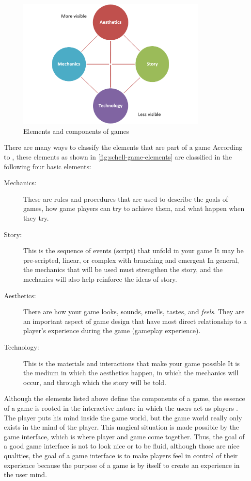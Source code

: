 \begin{figure}[htb]
 \caption{Elements and components of games}
 \label{fig:schell-game-elements}
 \centering
 \includegraphics[width=0.85\textwidth]{images/chap-general-background/schell-game-elements.png}
\end{figure}

There are many ways to classify the elements that are part of a game
According to , these elements as shown in \autoref{fig:schell-game-elements} are classified in the following four basic elements:

\begin{description}
\item[Mechanics:] These are rules and procedures that are used to describe the goals of games, how game players can try to achieve them, and what happen when they try.
\item[Story:] This is the sequence of events (script) that unfold in your game
It may be pre-scripted, linear, or complex with branching and emergent
In general, the mechanics that will be used must strengthen the story, and the mechanics will also help reinforce the ideas of story.
\item[Aesthetics:] There are how your game looks, sounds, smells, tastes, and \emph{feels}.
They are an important aspect of game design that have most direct relationship to a player's experience during the game (gameplay experience).
\item[Technology:] This is the materials and interactions that make your game possible
It is the medium in which the aesthetics happen, in which the mechanics will occur, and through which the story will be told. 
\end{description}

Although the elements listed above define the components of a game, the essence of a game is rooted in the interactive nature in which the users act as players \cite{Schell2008}.
The player puts his mind inside the game world, but the game world really only exists in the mind of the player.
This magical situation is made possible by the game interface, which is where player and game come together.
Thus, the goal of a good game interface is not to look nice or to be fluid, although those are nice qualities, the goal of a game interface is to make players feel in control of their experience because the purpose of a game is by itself to create an experience in the user mind.

